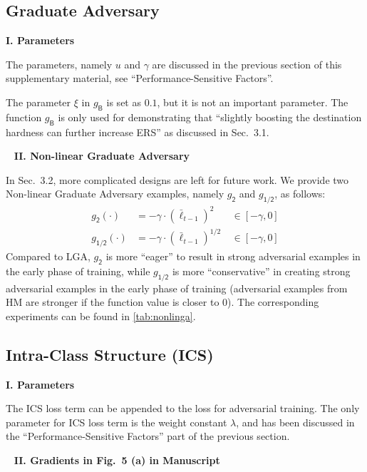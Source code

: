 \subsection{Graduate Adversary}
\label{sec:b3}

\noindent\textbf{I. Parameters}

The parameters, namely $u$ and $\gamma$ are discussed in the previous section
of this supplementary material, see ``Performance-Sensitive Factors''.

The parameter $\xi$ in $g_\mathsf{B}$ is set as $0.1$, but it is not an important parameter.
%
The function $g_\mathsf{B}$ is only used for demonstrating that ``slightly
boosting the destination hardness can further increase ERS'' as discussed
in Sec.~3.1.


~\newline
\noindent\textbf{II. Non-linear Graduate Adversary}

In Sec.~3.2, more complicated designs are left for future work.
%
We provide two Non-linear Graduate Adversary examples, namely
$g_\mathsf{2}$ and $g_\mathsf{1/2}$, as follows:
%
\begin{align}
	g_\mathsf{2}(\cdot)   &= -\gamma \cdot (\bar{\ell}_{t-1})^{2}  &~ \in [-\gamma,0]\\
	g_\mathsf{1/2}(\cdot) &= -\gamma \cdot (\bar{\ell}_{t-1})^{1/2} &~ \in [-\gamma, 0]
\end{align}
%
Compared to LGA, $g_\mathsf{2}$ is more ``eager'' to result in strong adversarial
examples in the early phase of training, while $g_\mathsf{1/2}$ is more ``conservative''
in creating strong adversarial examples in the early phase of training
(adversarial examples from HM are stronger if the function value is closer to $0$).
%
The corresponding experiments can be found in \cref{tab:nonlinga}.

\subsection{Intra-Class Structure (ICS)}

\noindent\textbf{I. Parameters}

The ICS loss term can be appended to the loss for adversarial training.
%
The only parameter for ICS loss term is the weight constant $\lambda$,
and has been discussed in the ``Performance-Sensitive Factors'' part
of the previous section.

~\newline
\noindent\textbf{II. Gradients in Fig.~5 (a) in Manuscript}

